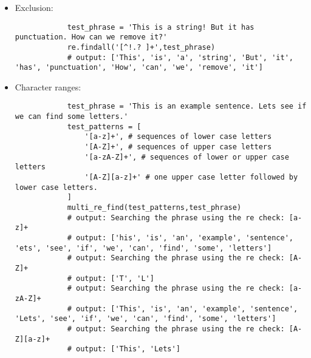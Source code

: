 \begin{itemize}
    \item Exclusion: 
        \begin{verbatim}
            test_phrase = 'This is a string! But it has punctuation. How can we remove it?'
            re.findall('[^!.? ]+',test_phrase)
            # output: ['This', 'is', 'a', 'string', 'But', 'it', 'has', 'punctuation', 'How', 'can', 'we', 'remove', 'it']
        \end{verbatim}
    
    \item Character ranges: 
        \begin{verbatim}
            test_phrase = 'This is an example sentence. Lets see if we can find some letters.'
            test_patterns = [
                '[a-z]+', # sequences of lower case letters
                '[A-Z]+', # sequences of upper case letters
                '[a-zA-Z]+', # sequences of lower or upper case letters 
                '[A-Z][a-z]+' # one upper case letter followed by lower case letters.
            ]
            multi_re_find(test_patterns,test_phrase)
            # output: Searching the phrase using the re check: [a-z]+
            # output: ['his', 'is', 'an', 'example', 'sentence', 'ets', 'see', 'if', 'we', 'can', 'find', 'some', 'letters']
            # output: Searching the phrase using the re check: [A-Z]+
            # output: ['T', 'L']
            # output: Searching the phrase using the re check: [a-zA-Z]+
            # output: ['This', 'is', 'an', 'example', 'sentence', 'Lets', 'see', 'if', 'we', 'can', 'find', 'some', 'letters']
            # output: Searching the phrase using the re check: [A-Z][a-z]+
            # output: ['This', 'Lets']
        \end{verbatim}
    

\end{itemize}
